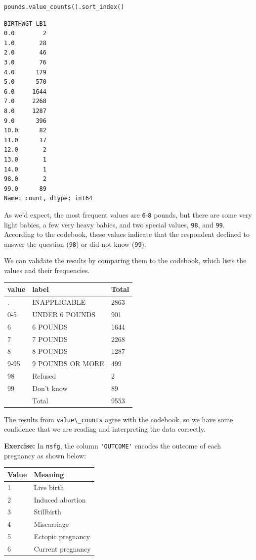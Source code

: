 \begin{lstlisting}[language=Python,style=source]
pounds.value_counts().sort_index()
\end{lstlisting}

\begin{lstlisting}[style=output]
BIRTHWGT_LB1
0.0        2
1.0       28
2.0       46
3.0       76
4.0      179
5.0      570
6.0     1644
7.0     2268
8.0     1287
9.0      396
10.0      82
11.0      17
12.0       2
13.0       1
14.0       1
98.0       2
99.0      89
Name: count, dtype: int64
\end{lstlisting}

As we'd expect, the most frequent values are
\passthrough{\lstinline!6!}-\passthrough{\lstinline!8!} pounds, but
there are some very light babies, a few very heavy babies, and two
special values, \passthrough{\lstinline!98!}, and
\passthrough{\lstinline!99!}. According to the codebook, these values
indicate that the respondent declined to answer the question
(\passthrough{\lstinline!98!}) or did not know
(\passthrough{\lstinline!99!}).

We can validate the results by comparing them to the codebook, which
lists the values and their frequencies.

\begin{longtable}[]{@{}lll@{}}
\midrule()
value & label & Total \\
\midrule()
\endhead
. & INAPPLICABLE & 2863 \\
0-5 & UNDER 6 POUNDS & 901 \\
6 & 6 POUNDS & 1644 \\
7 & 7 POUNDS & 2268 \\
8 & 8 POUNDS & 1287 \\
9-95 & 9 POUNDS OR MORE & 499 \\
98 & Refused & 2 \\
99 & Don't know & 89 \\
& Total & 9553 \\
\midrule()
\end{longtable}

The results from \passthrough{\lstinline!value\_counts!} agree with the
codebook, so we have some confidence that we are reading and
interpreting the data correctly.

\textbf{Exercise:} In \passthrough{\lstinline!nsfg!}, the column
\passthrough{\lstinline!'OUTCOME'!} encodes the outcome of each
pregnancy as shown below:

\begin{longtable}[]{@{}ll@{}}
\midrule()
Value & Meaning \\
\midrule()
\endhead
1 & Live birth \\
2 & Induced abortion \\
3 & Stillbirth \\
4 & Miscarriage \\
5 & Ectopic pregnancy \\
6 & Current pregnancy \\
\midrule()
\end{longtable}

